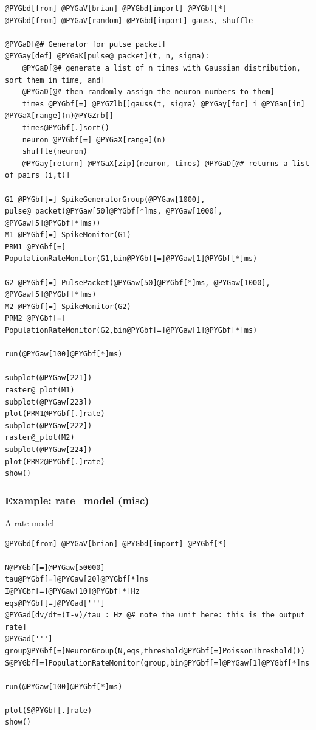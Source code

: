 \documentclass[letterpaper,10pt,english]{manual}
\begin{document}
\begin{Verbatim}[commandchars=@\[\]]
@PYGbd[from] @PYGaV[brian] @PYGbd[import] @PYGbf[*]
@PYGbd[from] @PYGaV[random] @PYGbd[import] gauss, shuffle

@PYGaD[@# Generator for pulse packet]
@PYGay[def] @PYGaK[pulse@_packet](t, n, sigma):
    @PYGaD[@# generate a list of n times with Gaussian distribution, sort them in time, and]
    @PYGaD[@# then randomly assign the neuron numbers to them]
    times @PYGbf[=] @PYGZlb[]gauss(t, sigma) @PYGay[for] i @PYGan[in] @PYGaX[range](n)@PYGZrb[]
    times@PYGbf[.]sort()
    neuron @PYGbf[=] @PYGaX[range](n)
    shuffle(neuron)
    @PYGay[return] @PYGaX[zip](neuron, times) @PYGaD[@# returns a list of pairs (i,t)]

G1 @PYGbf[=] SpikeGeneratorGroup(@PYGaw[1000], pulse@_packet(@PYGaw[50]@PYGbf[*]ms, @PYGaw[1000], @PYGaw[5]@PYGbf[*]ms))
M1 @PYGbf[=] SpikeMonitor(G1)
PRM1 @PYGbf[=] PopulationRateMonitor(G1,bin@PYGbf[=]@PYGaw[1]@PYGbf[*]ms)

G2 @PYGbf[=] PulsePacket(@PYGaw[50]@PYGbf[*]ms, @PYGaw[1000], @PYGaw[5]@PYGbf[*]ms)
M2 @PYGbf[=] SpikeMonitor(G2)
PRM2 @PYGbf[=] PopulationRateMonitor(G2,bin@PYGbf[=]@PYGaw[1]@PYGbf[*]ms)

run(@PYGaw[100]@PYGbf[*]ms)

subplot(@PYGaw[221])
raster@_plot(M1)
subplot(@PYGaw[223])
plot(PRM1@PYGbf[.]rate)
subplot(@PYGaw[222])
raster@_plot(M2)
subplot(@PYGaw[224])
plot(PRM2@PYGbf[.]rate)
show()
\end{Verbatim}

\resetcurrentobjects
\hypertarget{--doc-examples-misc_rate_model}{}

\hypertarget{index-81}{}\subsubsection{Example: rate\_model (misc)}

A rate model

\begin{Verbatim}[commandchars=@\[\]]
@PYGbd[from] @PYGaV[brian] @PYGbd[import] @PYGbf[*]

N@PYGbf[=]@PYGaw[50000]
tau@PYGbf[=]@PYGaw[20]@PYGbf[*]ms
I@PYGbf[=]@PYGaw[10]@PYGbf[*]Hz
eqs@PYGbf[=]@PYGad[''']
@PYGad[dv/dt=(I-v)/tau : Hz @# note the unit here: this is the output rate]
@PYGad[''']
group@PYGbf[=]NeuronGroup(N,eqs,threshold@PYGbf[=]PoissonThreshold())
S@PYGbf[=]PopulationRateMonitor(group,bin@PYGbf[=]@PYGaw[1]@PYGbf[*]ms)

run(@PYGaw[100]@PYGbf[*]ms)

plot(S@PYGbf[.]rate)
show()
\end{Verbatim}
\end{document}
